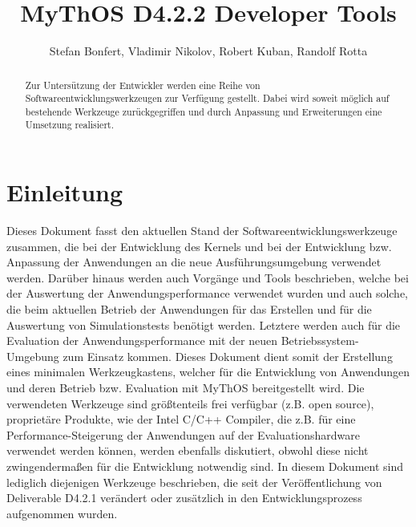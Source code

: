 

\title{MyThOS D4.2.2 Developer Tools}
\author{Stefan Bonfert, Vladimir Nikolov, Robert Kuban, Randolf Rotta}



\maketitle

\begin{abstract}
Zur Untersützung der Entwickler werden eine Reihe von Softwareentwicklungswerkzeugen zur Verfügung gestellt. Dabei wird soweit möglich auf bestehende Werkzeuge zurückgegriffen und durch Anpassung und Erweiterungen eine Umsetzung realisiert.
\end{abstract}

\newpage
\tableofcontents
\newpage

\section{Einleitung}
Dieses Dokument fasst den aktuellen Stand der Softwareentwicklungswerkzeuge 
zusammen, die bei
der Entwicklung des Kernels und bei der Entwicklung bzw. Anpassung der 
Anwendungen an die neue
Ausführungsumgebung verwendet werden. Darüber hinaus werden auch Vorgänge und 
Tools
beschrieben, welche bei der Auswertung der Anwendungsperformance verwendet 
wurden und auch
solche, die beim aktuellen Betrieb der Anwendungen für das Erstellen und für 
die Auswertung von
Simulationstests benötigt werden. Letztere werden auch für die Evaluation der
Anwendungsperformance mit der neuen Betriebssystem-Umgebung zum Einsatz kommen.
Dieses Dokument dient somit der Erstellung eines minimalen Werkzeugkastens, 
welcher für die
Entwicklung von Anwendungen und deren Betrieb bzw. Evaluation mit MyThOS 
bereitgestellt wird.
Die verwendeten Werkzeuge sind größtenteils frei verfügbar (z.B. open source), 
proprietäre
Produkte, wie der Intel C/C++ Compiler, die z.B. für eine 
Performance-Steigerung der Anwendungen
auf der Evaluationshardware verwendet werden können, werden ebenfalls 
diskutiert, obwohl diese
nicht zwingendermaßen für die Entwicklung notwendig sind.
In diesem Dokument sind lediglich diejenigen Werkzeuge beschrieben, die seit 
der Veröffentlichung von Deliverable D4.2.1 verändert oder zusätzlich in den 
Entwicklungsprozess aufgenommen wurden.
